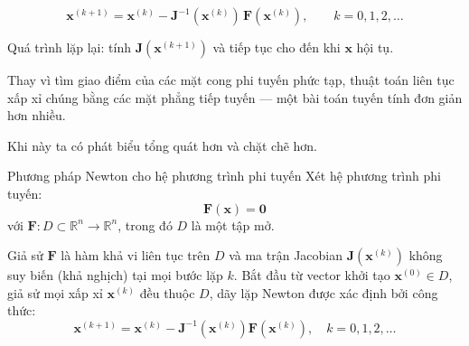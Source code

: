 \begin{equation}
    \mathbf{x}^{(k+1)} = \mathbf{x}^{(k)} - \mathbf{J}^{-1}\!\left(\mathbf{x}^{(k)}\right)\, \mathbf{F}\!\left(\mathbf{x}^{(k)}\right), \qquad k = 0,1,2,\ldots
    \label{eq:newton_nd}
\end{equation}

Quá trình lặp lại: tính $\mathbf{J}(\mathbf{x}^{(k+1)})$ và tiếp tục cho đến khi $\mathbf{x}$ hội tụ.

Thay vì tìm giao điểm của các mặt cong phi tuyến phức tạp, thuật toán liên tục xấp xỉ chúng bằng các mặt phẳng tiếp tuyến — một bài toán tuyến tính đơn giản hơn nhiều.

Khi này ta có phát biểu tổng quát hơn và chặt chẽ hơn.


\begin{bt}{Phương pháp Newton cho hệ phương trình phi tuyến}
Xét hệ phương trình phi tuyến:
$$
\mathbf{F}(\mathbf{x})=\mathbf{0}
$$
với $\mathbf{F}: D \subset \mathbb{R}^n \rightarrow \mathbb{R}^n$, trong đó $D$ là một tập mở.

Giả sử $\mathbf{F}$ là hàm khả vi liên tục trên $D$ và ma trận Jacobian $\mathbf{J}\!\left(\mathbf{x}^{(k)}\right)$ không suy biến (khả nghịch) tại mọi bước lặp $k$. 
Bắt đầu từ vector khởi tạo $\mathbf{x}^{(0)} \in D$, giả sử mọi xấp xỉ $\mathbf{x}^{(k)}$ đều thuộc $D$, dãy lặp Newton được xác định bởi công thức:
\begin{equation}
    \mathbf{x}^{(k+1)}
    =
    \mathbf{x}^{(k)}
    -
    \mathbf{J}^{-1}\!\left(\mathbf{x}^{(k)}\right)\mathbf{F}\!\left(\mathbf{x}^{(k)}\right), \quad k = 0, 1, 2, \dots
\end{equation}
\end{bt}




